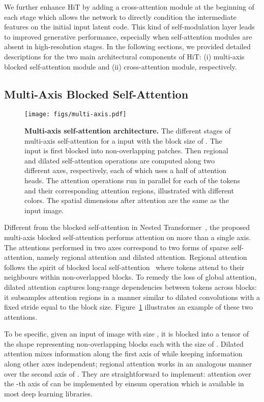 \documentclass{article}
\begin{document}
We further enhance HiT by adding a cross-attention module at the beginning of each stage which allows the network to directly condition the intermediate features on the initial input latent code. This kind of self-modulation layer leads to improved generative performance, especially when self-attention modules are absent in high-resolution stages. In the following sections, we provided detailed descriptions for the two main architectural components of HiT: (i) multi-axis blocked self-attention module and (ii) cross-attention module, respectively. 

\subsection{Multi-Axis Blocked Self-Attention}

\begin{figure}[t]
  \centering
  \texttt{[image: figs/multi-axis.pdf]}
  \vspace{-0.8em}
  \caption{\textbf{Multi-axis self-attention architecture.} The different stages of multi-axis self-attention for a  input with the block size of . The input is first blocked into  non-overlapping  patches. Then regional and dilated self-attention operations are computed along two different axes, respectively, each of which uses a half of attention heads. The attention operations run in parallel for each of the tokens and their corresponding attention regions, illustrated with different colors. The spatial dimensions after attention are the same as the input image.}
  \label{fig:multi-axis}
\end{figure}

Different from the blocked self-attention in Nested Transformer~\cite{zhang2021aggregating}, the proposed multi-axis blocked self-attention performs attention on more than a single axis. The attentions performed in two axes correspond to two forms of sparse self-attention, namely regional attention and dilated attention. Regional attention follows the spirit of blocked local self-attention~\cite{liu2021swin,vaswani2021scaling} where tokens attend to their neighbours within non-overlapped blocks. To remedy the loss of global attention, dilated attention captures long-range dependencies between tokens across blocks: it subsamples attention regions in a manner similar to dilated convolutions with a fixed stride equal to the block size.  Figure~\ref{fig:multi-axis} illustrates an example of these two attentions. 

To be specific, given an input of image with size , it is blocked into a tensor  of the shape  representing  non-overlapping blocks each with the size of . Dilated attention mixes information along the first axis of  while keeping information along other axes independent; regional attention works in an analogous manner over the second axis of . They are straightforward to implement: attention over the -th axis of  can be implemented by einsum operation which is available in most deep learning libraries. 
\end{document}

